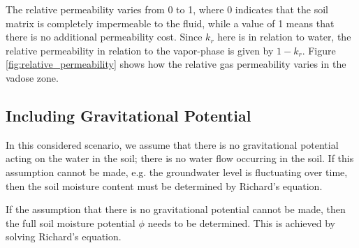 The relative permeability varies from 0 to 1, where 0 indicates that the soil matrix is completely impermeable to the fluid, while a value of 1 means that there is no additional permeability cost.
Since $k_r$ here is in relation to water, the relative permeability in relation to the vapor-phase is given by $1 - k_r$.
Figure \ref{fig:relative_permeability} shows how the relative gas permeability varies in the vadose zone.\par

\subsection{Including Gravitational Potential}
In this considered scenario, we assume that there is no gravitational potential acting on the water in the soil; there is no water flow occurring in the soil.
If this assumption cannot be made, e.g. the groundwater level is fluctuating over time, then the soil moisture content must be determined by Richard's equation.

If the assumption that there is no gravitational potential cannot be made, then the full soil moisture potential $\phi$ needs to be determined.
This is achieved by solving Richard's equation.\par %

\begin{comment}
\begin{equation}\label{eq:van_genuchten_moisture_capacity}
  C_m =
    \begin{cases}
      \frac{\alpha m}{1-m}(\theta_s - \theta_r)\mathrm{Se}^{\frac{1}{m}}\big( 1 - \mathrm{Se}^{\frac{1}{m}} \big)^m & h < 0 \\
    0 & h \geq 0
    \end{cases} \\
\end{equation}
\end{comment}
